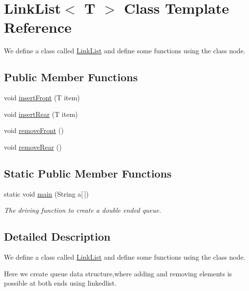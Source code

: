 \hypertarget{classLinkList}{}\section{Link\+List$<$ T $>$ Class Template Reference}
\label{classLinkList}


We define a class called \hyperlink{classLinkList}{Link\+List} and define some functions using the class node.  


\subsection*{Public Member Functions}
\begin{DoxyCompactItemize}
\item 
void \hyperlink{classLinkList_a38b2e77462f2733bc9254c3fd86b453f}{insert\+Front} (T item)
\item 
void \hyperlink{classLinkList_af0f013b563ae0abaec5c22037ec31e28}{insert\+Rear} (T item)
\item 
void \hyperlink{classLinkList_ae4d698669105fff350b578de53e7e389}{remove\+Front} ()
\item 
void \hyperlink{classLinkList_af7894809851c2478fdb3272bd0584b6c}{remove\+Rear} ()
\end{DoxyCompactItemize}
\subsection*{Static Public Member Functions}
\begin{DoxyCompactItemize}
\item 
static void \hyperlink{classLinkList_a62eb2e6bd32c8bdaa9bd26b5cef6c2c8}{main} (String a\mbox{[}$\,$\mbox{]})
\begin{DoxyCompactList}\small\item\em The driving function to create a double ended queue. \end{DoxyCompactList}\end{DoxyCompactItemize}


\subsection{Detailed Description}
We define a class called \hyperlink{classLinkList}{Link\+List} and define some functions using the class node. 

Here we create queue data structure,where adding and removing elements is possible at both ends using linkedlist. 

